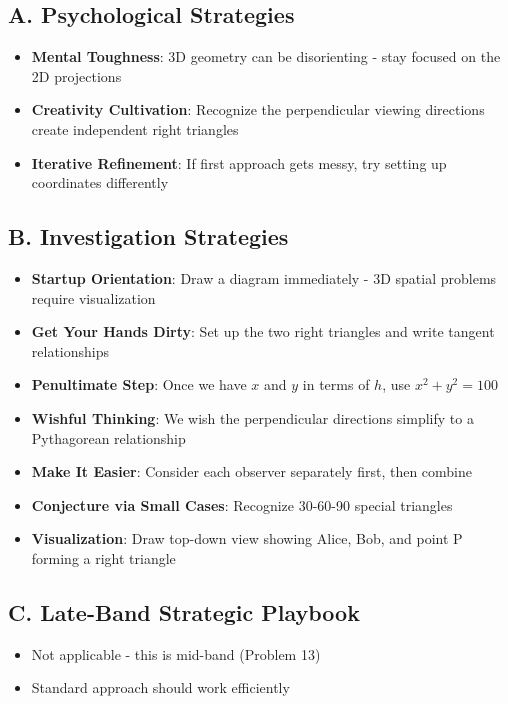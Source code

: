 \documentclass[12pt]{article}
\begin{document}
\begin{strategicbox}
\subsection*{A. Psychological Strategies}
\begin{itemize}[leftmargin=*]
    \item \textbf{Mental Toughness}: 3D geometry can be disorienting - stay focused on the 2D projections
    \item \textbf{Creativity Cultivation}: Recognize the perpendicular viewing directions create independent right triangles
    \item \textbf{Iterative Refinement}: If first approach gets messy, try setting up coordinates differently
\end{itemize}

\subsection*{B. Investigation Strategies}
\begin{itemize}[leftmargin=*]
    \item \textbf{Startup Orientation}: Draw a diagram immediately - 3D spatial problems require visualization
    \item \textbf{Get Your Hands Dirty}: Set up the two right triangles and write tangent relationships
    \item \textbf{Penultimate Step}: Once we have $x$ and $y$ in terms of $h$, use $x^2 + y^2 = 100$
    \item \textbf{Wishful Thinking}: We wish the perpendicular directions simplify to a Pythagorean relationship
    \item \textbf{Make It Easier}: Consider each observer separately first, then combine
    \item \textbf{Conjecture via Small Cases}: Recognize 30-60-90 special triangles
    \item \textbf{Visualization}: Draw top-down view showing Alice, Bob, and point P forming a right triangle
\end{itemize}

\subsection*{C. Late-Band Strategic Playbook}
\begin{itemize}[leftmargin=*]
    \item Not applicable - this is mid-band (Problem 13)
    \item Standard approach should work efficiently
\end{itemize}


\end{strategicbox}
\end{document}
